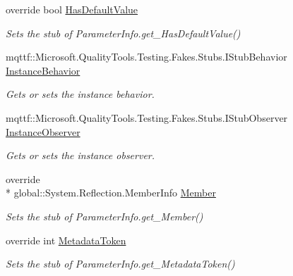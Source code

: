 \begin{DoxyCompactItemize}
override bool \hyperlink{class_system_1_1_reflection_1_1_fakes_1_1_stub_parameter_info_a603ab476e4fc578ee6b596d1989e4817}{Has\-Default\-Value}
\begin{DoxyCompactList}\small\item\em Sets the stub of Parameter\-Info.\-get\-\_\-\-Has\-Default\-Value()\end{DoxyCompactList}\item 
mqttf\-::\-Microsoft.\-Quality\-Tools.\-Testing.\-Fakes.\-Stubs.\-I\-Stub\-Behavior \hyperlink{class_system_1_1_reflection_1_1_fakes_1_1_stub_parameter_info_a7a6af035811699655c41de670e71f057}{Instance\-Behavior}
\begin{DoxyCompactList}\small\item\em Gets or sets the instance behavior.\end{DoxyCompactList}\item 
mqttf\-::\-Microsoft.\-Quality\-Tools.\-Testing.\-Fakes.\-Stubs.\-I\-Stub\-Observer \hyperlink{class_system_1_1_reflection_1_1_fakes_1_1_stub_parameter_info_a500880508f9d1f6aab61d44ce76e23ed}{Instance\-Observer}
\begin{DoxyCompactList}\small\item\em Gets or sets the instance observer.\end{DoxyCompactList}\item 
override \\*
global\-::\-System.\-Reflection.\-Member\-Info \hyperlink{class_system_1_1_reflection_1_1_fakes_1_1_stub_parameter_info_ae75f5297af843763aa7905bfff16ec82}{Member}
\begin{DoxyCompactList}\small\item\em Sets the stub of Parameter\-Info.\-get\-\_\-\-Member()\end{DoxyCompactList}\item 
override int \hyperlink{class_system_1_1_reflection_1_1_fakes_1_1_stub_parameter_info_ad8cd97a3c1ed88ac99cbf5083d34aee6}{Metadata\-Token}
\begin{DoxyCompactList}\small\item\em Sets the stub of Parameter\-Info.\-get\-\_\-\-Metadata\-Token()\end{DoxyCompactList}\item 

\end{DoxyCompactItemize}
